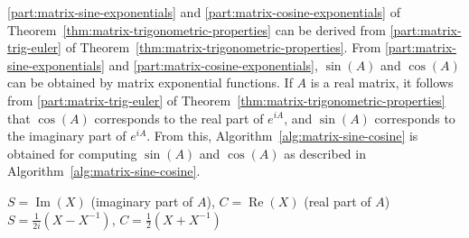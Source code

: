 {\ref{part:matrix-sine-exponentials} and \ref{part:matrix-cosine-exponentials} of Theorem~\ref{thm:matrix-trigonometric-properties} can be derived from \ref{part:matrix-trig-euler} of Theorem~\ref{thm:matrix-trigonometric-properties}. From \ref{part:matrix-sine-exponentials} and \ref{part:matrix-cosine-exponentials}, $\sin(A)$ and $\cos(A)$ can be obtained by matrix exponential functions. If $A$ is a real matrix, it follows from \ref{part:matrix-trig-euler} of Theorem~\ref{thm:matrix-trigonometric-properties} that $\cos(A)$ corresponds to the real part of $e^{iA}$, and $\sin(A)$ corresponds to the imaginary part of $e^{iA}$. From this, Algorithm~\ref{alg:matrix-sine-cosine} is obtained for computing $\sin(A)$ and $\cos(A)$ as described in Algorithm~\ref{alg:matrix-sine-cosine}.}

\begin{algorithm}[H]\caption{{Computation of $S=\sin(A)$ and $C=\cos(A)$}}\label{alg:matrix-sine-cosine}\begin{algorithmic}[1]
\State $S=\operatorname{Im}(X)$ ({imaginary part of $A$}), $C=\operatorname{Re}(X)$ ({real part of $A$})
\EndIf
{}
\State $S=\frac{1}{2i}(X-X^{-1})$, $C=\frac{1}{2}(X+X^{-1})$
\EndIf
\end{algorithmic}\end{algorithm}
